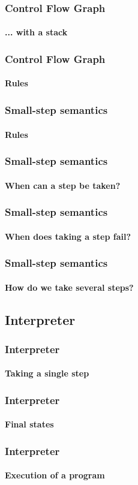 \begin{frame}
\frametitle{Control Flow Graph}
\framesubtitle{... with a stack}


\end{frame}


\begin{frame}
\frametitle{Control Flow Graph}
\framesubtitle{Rules}


\end{frame}


\begin{frame}
\frametitle{Small-step semantics}
\framesubtitle{Rules}


\end{frame}


\begin{frame}
\frametitle{Small-step semantics}
\framesubtitle{When can a step be taken?}


\end{frame}


\begin{frame}
\frametitle{Small-step semantics}
\framesubtitle{When does taking a step fail?}


\end{frame}


\begin{frame}
\frametitle{Small-step semantics}
\framesubtitle{How do we take several steps?}


\end{frame}


\subsection{Interpreter}

\begin{frame}
\frametitle{Interpreter}
\framesubtitle{Taking a single step}


\end{frame}


\begin{frame}
\frametitle{Interpreter}
\framesubtitle{Final states}


\end{frame}


\begin{frame}
\frametitle{Interpreter}
\framesubtitle{Execution of a program}


\end{frame}
